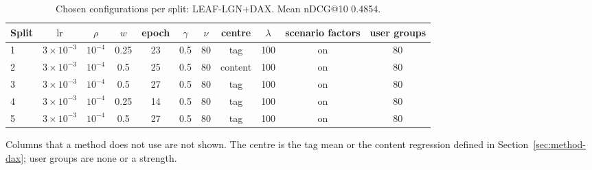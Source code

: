 \begin{table}[tbp]
\centering
\footnotesize
\caption{Chosen configurations per split: LEAF-LGN+DAX. Mean nDCG@10 0.4854.}
\label{tab:grid00}
\begin{adjustbox}{max width=\linewidth}
\begin{tabular}{lcccccccccc}
\toprule
Split & $\mathrm{lr}$ & $\rho$ & $w$ & epoch & $\gamma$ & $\nu$ & centre & $\lambda$ & scenario factors & user groups \\
\midrule
1 & $3\times10^{-3}$ & $10^{-4}$ & 0.25 & 23 & 0.5 & 80 & tag & 100 & on & 80 \\
2 & $3\times10^{-3}$ & $10^{-4}$ & 0.5 & 25 & 0.5 & 80 & content & 100 & on & 80 \\
3 & $3\times10^{-3}$ & $10^{-4}$ & 0.5 & 27 & 0.5 & 80 & tag & 100 & on & 80 \\
4 & $3\times10^{-3}$ & $10^{-4}$ & 0.25 & 14 & 0.5 & 80 & tag & 100 & on & 80 \\
5 & $3\times10^{-3}$ & $10^{-4}$ & 0.5 & 27 & 0.5 & 80 & tag & 100 & on & 80 \\
\bottomrule
\end{tabular}
\end{adjustbox}
\par\smallskip
\begin{minipage}{\linewidth}\raggedright\footnotesize Columns that a method does not use are not shown. The centre is the tag mean or the content regression defined in Section~\ref{sec:method-dax}; user groups are none or a strength.\end{minipage}
\end{table}
